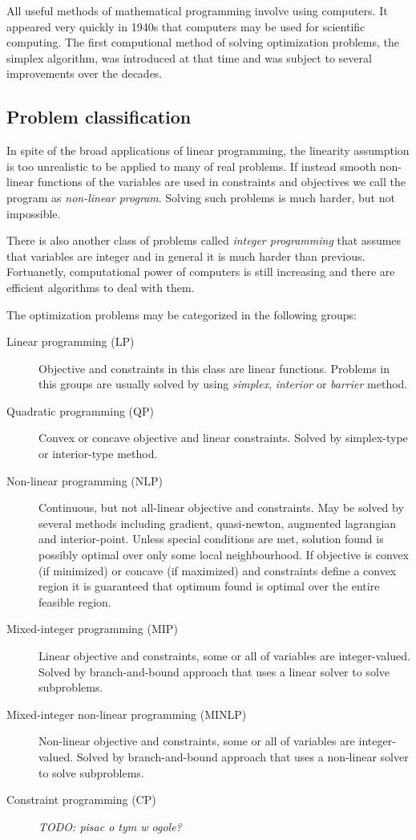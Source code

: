 All useful methods of mathematical programming involve using computers. It appeared very quickly in 1940s that computers may be used for scientific computing. The first computional method of solving optimization problems, the simplex algorithm, was introduced at that time and was subject to several improvements over the decades.

\subsection{Problem classification}
\label{ampl:classification}

In spite of the broad applications of linear programming, the linearity assumption is too unrealistic to be applied to many of real problems. If instead smooth non-linear functions of the variables are used in constraints and objectives we call the program as \emph{non-linear program}. Solving such problems is much harder, but not impossible.

There is also another class of problems called \emph{integer programming} that assumes that variables are integer and in general it is much harder than previous. Fortuanetly, computational power of computers is still increasing and there are efficient algorithms to deal with them.

The optimization problems may be categorized in the following groups:
\begin{description}
  \item[Linear programming (LP)] Objective and constraints in this class are linear functions. Problems in this groups are usually solved by using \emph{simplex}, \emph{interior} or \emph{barrier} method.
  \item[Quadratic programming (QP)] Convex or concave objective and linear constraints. Solved by simplex-type or interior-type method.
  \item[Non-linear programming (NLP)] Continuous, but not all-linear objective and constraints. May be solved by several methods including gradient, quasi-newton, augmented lagrangian and interior-point. Unless special conditions are met, solution found is possibly optimal over only some local neighbourhood. If objective is convex (if minimized) or concave (if maximized) and constraints define a convex region it is guaranteed that optimum found is optimal over the entire feasible region.
  \item[Mixed-integer programming (MIP)] Linear objective and constraints, some or all of variables are integer-valued. Solved by branch-and-bound approach that uses a linear solver to solve subproblems.
  \item[Mixed-integer non-linear programming (MINLP)] Non-linear objective and constraints, some or all of variables are integer-valued. Solved by branch-and-bound approach that uses a non-linear solver to solve subproblems.
  \item[Constraint programming (CP)] \emph{TODO: pisac o tym w ogole?}
\end{description}

